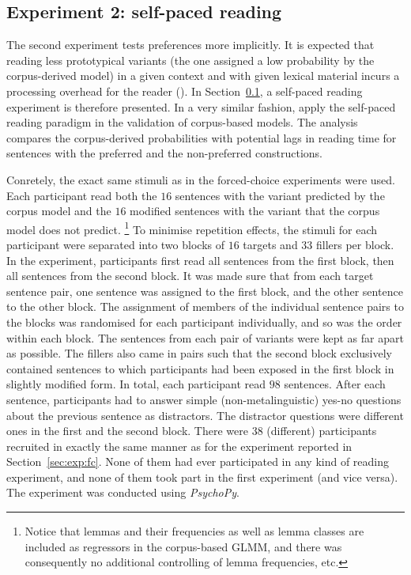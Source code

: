 \documentclass[USenglish]{article}
\begin{document}

\subsection{Experiment 2: self-paced reading}
\label{sec:exp:spr}

The second experiment tests preferences more implicitly.
It is expected that reading less prototypical variants (the one assigned a low probability by the corpus-derived model) in a given context and with given lexical material incurs a processing overhead for the reader (\citealp{Kaiser2013}).
In Section~\ref{sec:exp:spr}, a self-paced reading experiment is therefore presented.
In a very similar fashion, \cite{DivjakEa2016} apply the self-paced reading paradigm in the validation of corpus-based models.
The analysis compares the corpus-derived probabilities with potential lags in reading time for sentences with the preferred and the non-preferred constructions.

Conretely, the exact same stimuli as in the forced-choice experiments were used.
Each participant read both the $16$ sentences with the variant predicted by the corpus model and the $16$ modified sentences with the variant that the corpus model does not predict.%
\footnote{Notice that lemmas and their frequencies as well as lemma classes are included as regressors in the corpus-based GLMM, and there was consequently no additional controlling of lemma frequencies, etc.}
To minimise repetition effects, the stimuli for each participant were separated into two blocks of $16$ targets and $33$ fillers per block.
In the experiment, participants first read all sentences from the first block, then all sentences from the second block.
It was made sure that from each target sentence pair, one sentence was assigned to the first block, and the other sentence to the other block.
The assignment of members of the individual sentence pairs to the blocks was randomised for each participant individually, and so was the order within each block.
The sentences from each pair of variants were kept as far apart as possible.
The fillers also came in pairs such that the second block exclusively contained sentences to which participants had been exposed in the first block in slightly modified form.
In total, each participant read $98$ sentences.
After each sentence, participants had to answer simple (non-metalinguistic) yes-no questions about the previous sentence as distractors.
The distractor questions were different ones in the first and the second block.
There were $38$ (different) participants recruited in exactly the same manner as for the experiment reported in Section~\ref{sec:exp:fc}.
None of them had ever participated in any kind of reading experiment, and none of them took part in the first experiment (and vice versa).
The experiment was conducted using \textit{PsychoPy}.
\end{document}
